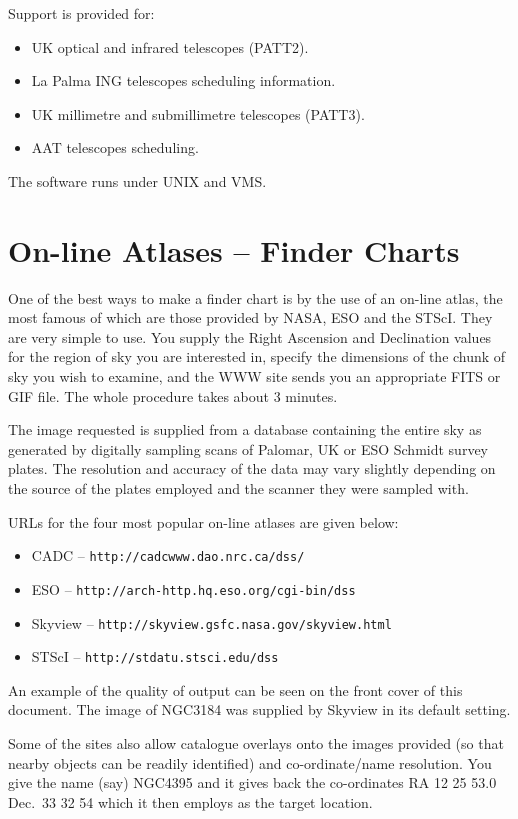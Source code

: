 \documentclass[twoside,11pt]{article}
\newcommand{\htmladdnormallink}[2]{#1}
\newcommand{\xlabel}[1]{}
\newcommand{\CADCref}{\htmladdnormallink{\tt http://cadcwww.dao.nrc.ca/dss/}{http://cadcwww.dao.nrc.ca/dss/}}
\newcommand{\HTTPDref}{\htmladdnormallink{\tt http://skyview.gsfc.nasa.gov/skyview.html}{http://skyview.gsfc.nasa.gov/skyview.html}}
\newcommand{\HTTPEref}{\htmladdnormallink{\tt http://arch-http.hq.eso.org/cgi-bin/dss}{http://arch-http.hq.eso.org/cgi-bin/dss}}
\newcommand{\HTTPFref}{\htmladdnormallink{\tt http://stdatu.stsci.edu/dss}{http://stdatu.stsci.edu/dss}}
\begin{document}
Support is provided for:

\begin{itemize}
\item UK optical and infrared telescopes (PATT2).
\item La Palma ING telescopes scheduling information. 
\item UK millimetre and submillimetre telescopes (PATT3).
\item AAT telescopes scheduling. 
\end{itemize}

The software runs under UNIX and VMS.

\section{On-line Atlases -- Finder Charts} \xlabel{ATLASES}
\label{sec:atlases}

One of the best ways to make a finder chart is by the use of an on-line
atlas, the most famous of which are those provided by NASA, ESO and the STScI.
They are very simple to use. You supply the Right Ascension and Declination values for the region 
of sky you are interested in, specify the dimensions of the chunk of 
sky you wish to examine, and the WWW site sends you an appropriate FITS or GIF 
file. The whole procedure takes about 3 minutes. 

The image requested is supplied
from a database containing the entire sky as generated by digitally sampling 
scans of Palomar, UK or ESO Schmidt survey plates. The resolution and accuracy of the data may 
vary slightly depending on the source of the plates employed and the scanner 
they were sampled with.

URLs for the four most popular on-line atlases are given below:

\begin{itemize}
\item CADC -- {\CADCref}
\item ESO -- {\HTTPEref}   
\item Skyview -- {\HTTPDref}
\item STScI -- {\HTTPFref}
\end{itemize}

An example of the quality of output can be seen on the front cover of this document.
The image of NGC3184 was supplied by Skyview in its default setting. 

Some of the sites also allow catalogue overlays onto the images provided
(so that nearby objects can be readily identified)
and co-ordinate/name resolution. 
You give the name (say) NGC4395 and 
it gives back the co-ordinates  RA 12 25 53.0  Dec.\ 33 32 54 which it 
then employs as the target location.
\end{document}
